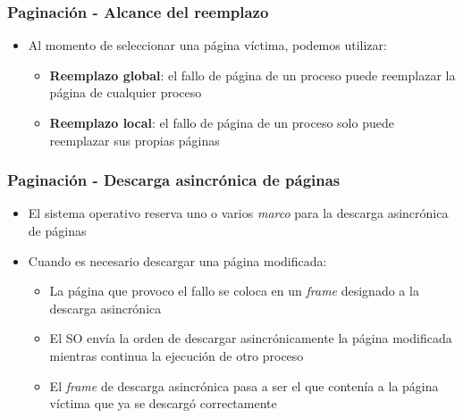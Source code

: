 \begin{frame}
  \frametitle{Paginación - Alcance del reemplazo}
  \begin{itemize}
  	\item Al momento de seleccionar una página víctima, podemos utilizar:
  	\begin{itemize}
  		\item \textbf{Reemplazo global}: el fallo de página de un proceso puede reemplazar la página de cualquier proceso
		\item \textbf{Reemplazo local}: el fallo de página de un proceso solo puede reemplazar sus propias páginas
  	\end{itemize}
  \end{itemize}
\end{frame}

\begin{frame}
  \frametitle{Paginación - Descarga asincrónica de páginas}
  \begin{itemize}
  	\item El sistema operativo reserva uno o varios \emph{marco} para la descarga asincrónica de páginas
  	\item Cuando es necesario descargar una página modificada:
  	\begin{itemize}
  		\item La página que provoco el fallo se coloca en un \emph{frame} designado a la descarga asincrónica
		\item El SO envía la orden de descargar asincrónicamente la página modificada mientras continua la ejecución de otro proceso
		\item El \emph{frame} de descarga asincrónica pasa a ser el que contenía a la página víctima que ya se descargó correctamente
  	\end{itemize}
  \end{itemize}
\end{frame}


